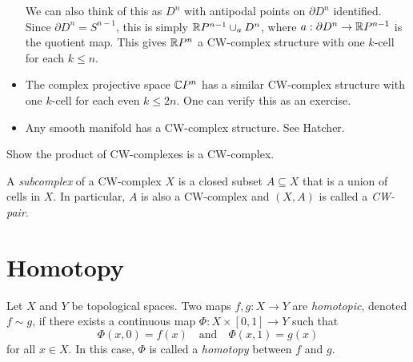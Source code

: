 \begin{example}
\begin{itemize}
      We can also think of this as $D^n$ with
      antipodal points on $\partial D^n$ identified.
      Since $\partial D^n = S^{n - 1}$, this is
      simply $\mathbb{R} P^{n - 1} \cup_{a} D^n$, where
      $a : \partial D^n \to \mathbb{R} P^{n - 1}$ is the
      quotient map. This gives $\mathbb{R} P^n$ a CW-complex
      structure with one $k$-cell for each $k \le n$.
    \item The complex projective space
      $\mathbb{C} P^n$ has a similar CW-complex structure with
      one $k$-cell for each even $k \le 2n$.
      One can verify this as an exercise.
    \item Any smooth manifold has a CW-complex
      structure. See Hatcher.
  \end{itemize}
\end{example}

\begin{exercise}
  Show the product of CW-complexes is a CW-complex.
\end{exercise}

\begin{definition}
  A \emph{subcomplex} of a CW-complex $X$ is a closed
  subset $A \subseteq X$ that is a union of cells in $X$.
  In particular, $A$ is also a CW-complex and
  $(X, A)$ is called a \emph{CW-pair}.
\end{definition}

\section{Homotopy}

\begin{definition}
  Let $X$ and $Y$ be topological spaces. Two maps
  $f, g : X \to Y$ are \emph{homotopic}, denoted
  $f \sim g$, if there exists a continuous map
  $\Phi : X \times [0, 1] \to Y$ such that
  \[
    \Phi(x, 0) = f(x) \quad \text{and} \quad \Phi(x, 1) = g(x)
  \]
  for all $x \in X$.
  In this case, $\Phi$ is called a \emph{homotopy}
  between $f$ and $g$.
\end{definition}


